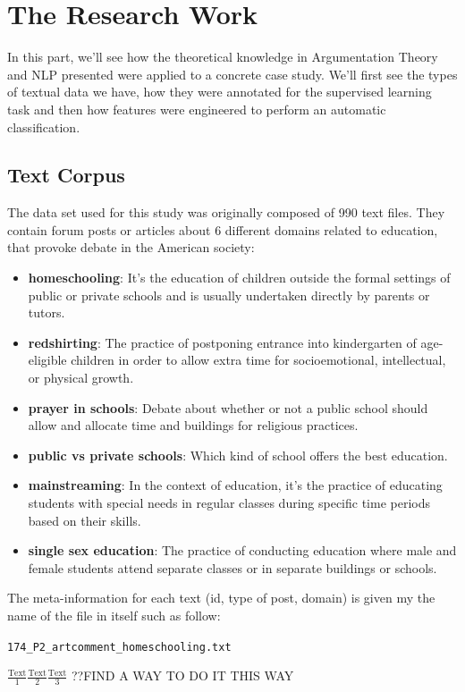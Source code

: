 \chapter{The Research Work} 
In this part, we'll see how the theoretical knowledge in Argumentation Theory and NLP presented were applied to a concrete case study. We'll first see the types of textual data we have, how they were annotated for the supervised learning task and then how features were engineered to perform an automatic classification.
\section{Text Corpus}
The data set used for this study was originally composed of 990 text files. They contain forum posts or articles about 6 different domains related to education, that provoke debate in the American society:
\begin{itemize}
  \item \textbf{homeschooling}: It's the education of children outside the formal settings of public or private schools and is usually undertaken directly by parents or tutors. 
  \item \textbf{redshirting}: The practice of postponing entrance into kindergarten of age-eligible children in order to allow extra time for socioemotional, intellectual, or physical growth. 
  \item \textbf{prayer in schools}: Debate about whether or not a public school should allow and allocate time and buildings for religious practices.
  \item \textbf{public vs private schools}: Which kind of school offers the best education.
  \item \textbf{mainstreaming}: In the context of education, it's the practice of educating students with special needs in regular classes during specific time periods based on their skills.
  \item \textbf{single sex education}: The practice of conducting education where male and female students attend separate classes or in separate buildings or schools.  
\end{itemize} 

The meta-information for each text (id, type of post, domain) is given my the name of the file in itself such as follow:

\centerline{\texttt{174\_P2\_artcomment\_homeschooling.txt}}

$\frac{ \textrm{Text}}{1} \frac{\textrm{Text}}{2} \frac{\textrm{Text}}{3}$
??FIND A WAY TO DO IT THIS WAY 

